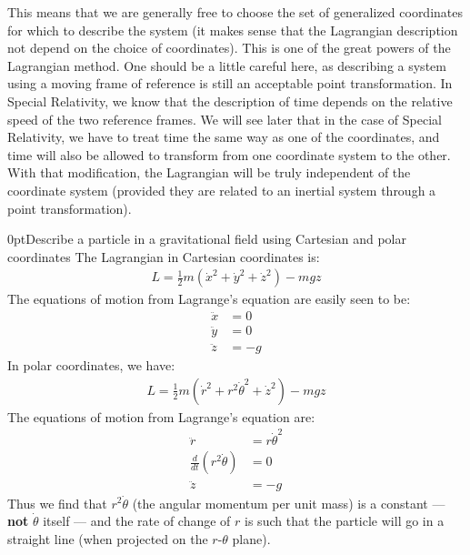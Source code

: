 This means that we are generally free to choose the set of generalized coordinates for which to describe the system (it makes sense that the Lagrangian description not depend on the choice of coordinates). This is one of the great powers of the Lagrangian method. One should be a little careful here, as describing a system using a moving frame of reference is still an acceptable point transformation. In Special Relativity, we know that the description of time depends on the relative speed of the two reference frames. We will see later that in the case of Special Relativity, we have to treat time the same way as one of the coordinates, and time will also be allowed to transform from one coordinate system to the other. With that modification, the Lagrangian will be truly independent of the coordinate system (provided they are related to an inertial system through a point transformation).

\begin{example}{0pt}{Describe a particle in a gravitational field using Cartesian and polar coordinates}{}
The Lagrangian in Cartesian coordinates is:
\begin{align*}
L=\frac{1}{2}m(\dot{x}^2+\dot{y}^2+\dot{z}^2)-mgz
\end{align*}
The equations of motion from Lagrange's equation are easily seen to be:
\begin{align*}
\ddot{x}&=0\\
\ddot{y}&=0\\
\ddot{z}&=-g
\end{align*}
In polar coordinates, we have:
\begin{align*}
L=\frac{1}{2}m(\dot{r}^2+r^2\dot{\theta}^2+\dot{z}^2)-mgz
\end{align*}
The equations of motion from Lagrange's equation are:
\begin{align*}
\ddot{r}&=r\dot{\theta}^2\\
\frac{d}{dt}\left(r^2\dot{\theta}\right)&=0\\
\ddot{z}&=-g
\end{align*}
Thus we find that $r^2\dot{\theta}$ (the angular momentum per unit mass) is a constant --- \textbf{not} $\dot{\theta}$ itself --- and the rate of change of $r$ is such that the particle will go in a straight line (when projected on the $r$-$\theta$ plane).
\end{example}

